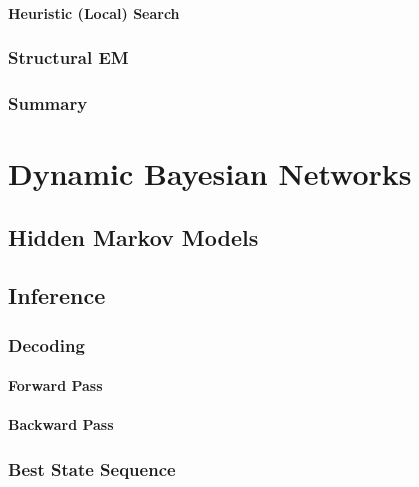 			\subsubsection{Heuristic (Local) Search} %

		\subsection{Structural EM} %

		\subsection{Summary} %

\chapter{Dynamic Bayesian Networks} %

	\section{Hidden Markov Models} %

	\section{Inference} %

		\subsection{Decoding} %

			\subsubsection{Forward Pass} %

			\subsubsection{Backward Pass} %

		\subsection{Best State Sequence} %

